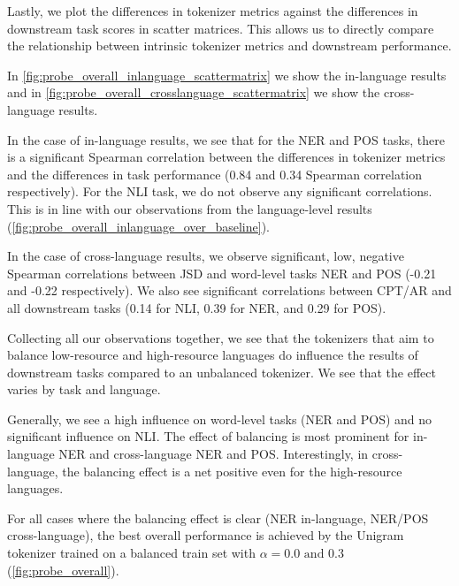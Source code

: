 Lastly, we plot the differences in tokenizer metrics against the differences in downstream task scores in scatter matrices. This allows us to directly compare the relationship between intrinsic tokenizer metrics and downstream performance.

In \autoref{fig:probe_overall_inlanguage_scattermatrix} we show the in-language results and in \autoref{fig:probe_overall_crosslanguage_scattermatrix} we show the cross-language results. 

In the case of in-language results, we see that for the NER and POS tasks, there is a significant Spearman correlation between the differences in tokenizer metrics and the differences in task performance (0.84 and 0.34 Spearman correlation respectively). For the NLI task, we do not observe any significant correlations. This is in line with our observations from the language-level results (\autoref{fig:probe_overall_inlanguage_over_baseline}). 

In the case of cross-language results, we observe significant, low, negative Spearman correlations between JSD and word-level tasks NER and POS (-0.21 and -0.22 respectively). We also see significant correlations between CPT/AR and all downstream tasks (0.14 for NLI, 0.39 for NER, and 0.29 for POS).

Collecting all our observations together, we see that the tokenizers that aim to balance low-resource and high-resource languages do influence the results of downstream tasks compared to an unbalanced tokenizer. We see that the effect varies by task and language. 

Generally, we see a high influence on word-level tasks (NER and POS) and no significant influence on NLI. The effect of balancing is most prominent for in-language NER and cross-language NER and POS. Interestingly, in cross-language, the balancing effect is a net positive even for the high-resource languages.

For all cases where the balancing effect is clear (NER in-language, NER/POS cross-language), the best overall performance is achieved by the Unigram tokenizer trained on a balanced train set with $\alpha=0.0\text{ and }0.3$ (\autoref{fig:probe_overall}).

